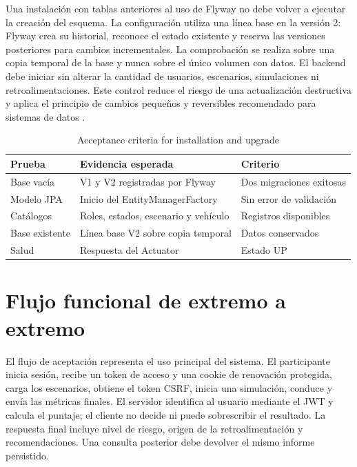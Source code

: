 \documentclass[11pt,a4paper]{report}
\begin{document}
Una instalación con tablas anteriores al uso de Flyway no debe volver a ejecutar
la creación del esquema. La configuración utiliza una línea base en la versión 2:
Flyway crea su historial, reconoce el estado existente y reserva las versiones
posteriores para cambios incrementales. La comprobación se realiza sobre una copia
temporal de la base y nunca sobre el único volumen con datos. El backend debe iniciar
sin alterar la cantidad de usuarios, escenarios, simulaciones ni retroalimentaciones.
Este control reduce el riesgo de una actualización destructiva y aplica el principio
de cambios pequeños y reversibles recomendado para sistemas de datos
\cite{kleppmann2017designing}.

\begin{table}[htbp]
\centering
\caption{Acceptance criteria for installation and upgrade}
\begin{tabularx}{\textwidth}{p{3.1cm}X p{3.2cm}}
\toprule
\textbf{Prueba} & \textbf{Evidencia esperada} & \textbf{Criterio} \\
\midrule
Base vacía & V1 y V2 registradas por Flyway & Dos migraciones exitosas \\
Modelo JPA & Inicio del EntityManagerFactory & Sin error de validación \\
Catálogos & Roles, estados, escenario y vehículo & Registros disponibles \\
Base existente & Línea base V2 sobre copia temporal & Datos conservados \\
Salud & Respuesta del Actuator & Estado UP \\
\bottomrule
\end{tabularx}
\end{table}

\section{Flujo funcional de extremo a extremo}

El flujo de aceptación representa el uso principal del sistema. El participante
inicia sesión, recibe un token de acceso y una cookie de renovación protegida, carga
los escenarios, obtiene el token CSRF, inicia una simulación, conduce y envía las
métricas finales. El servidor identifica al usuario mediante el JWT y calcula el
puntaje; el cliente no decide ni puede sobrescribir el resultado. La respuesta final
incluye nivel de riesgo, origen de la retroalimentación y recomendaciones. Una
consulta posterior debe devolver el mismo informe persistido.
\end{document}
